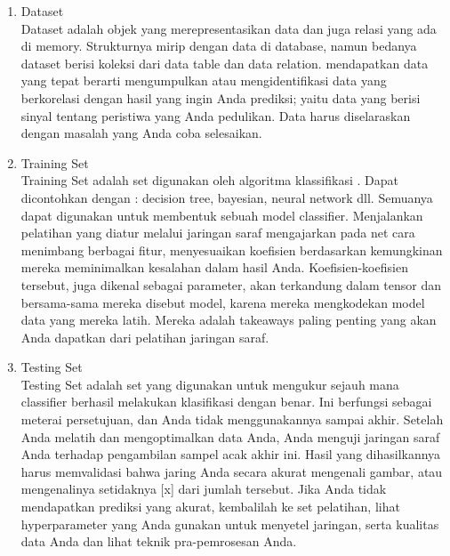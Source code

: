 \begin{enumerate}
\item Dataset\\
Dataset adalah objek yang merepresentasikan data dan juga relasi yang ada di memory. Strukturnya mirip dengan data di database, namun bedanya dataset berisi koleksi dari data table dan data relation. mendapatkan data yang tepat berarti mengumpulkan atau mengidentifikasi data yang berkorelasi dengan hasil yang ingin Anda prediksi; yaitu data yang berisi sinyal tentang peristiwa yang Anda pedulikan. Data harus diselaraskan dengan masalah yang Anda coba selesaikan.

\item Training Set\\
Training Set adalah set digunakan oleh algoritma klassifikasi . Dapat dicontohkan dengan : decision tree, bayesian, neural network dll. Semuanya dapat digunakan untuk membentuk sebuah model classifier. Menjalankan pelatihan yang diatur melalui jaringan saraf mengajarkan pada net cara menimbang berbagai fitur, menyesuaikan koefisien berdasarkan kemungkinan mereka meminimalkan kesalahan dalam hasil Anda. Koefisien-koefisien tersebut, juga dikenal sebagai parameter, akan terkandung dalam tensor dan bersama-sama mereka disebut model, karena mereka mengkodekan model data yang mereka latih. Mereka adalah takeaways paling penting yang akan Anda dapatkan dari pelatihan jaringan saraf.

\item Testing Set\\
Testing Set adalah set yang digunakan untuk mengukur sejauh mana classifier berhasil melakukan klasifikasi dengan benar. Ini berfungsi sebagai meterai persetujuan, dan Anda tidak menggunakannya sampai akhir. Setelah Anda melatih dan mengoptimalkan data Anda, Anda menguji jaringan saraf Anda terhadap pengambilan sampel acak akhir ini. Hasil yang dihasilkannya harus memvalidasi bahwa jaring Anda secara akurat mengenali gambar, atau mengenalinya setidaknya [x] dari jumlah tersebut. Jika Anda tidak mendapatkan prediksi yang akurat, kembalilah ke set pelatihan, lihat hyperparameter yang Anda gunakan untuk menyetel jaringan, serta kualitas data Anda dan lihat teknik pra-pemrosesan Anda.
\end{enumerate}

